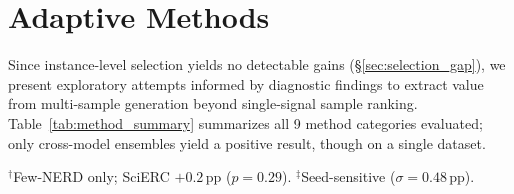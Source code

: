\section{Adaptive Methods}\label{sec:adaptive}

Since instance-level selection yields no detectable gains (\S\ref{sec:selection_gap}), we present exploratory attempts informed by diagnostic findings to extract value from multi-sample generation beyond single-signal sample ranking.
Table~\ref{tab:method_summary} summarizes all 9 method categories evaluated; only cross-model ensembles yield a positive result, though on a single dataset.

\begin{table}[t]
\centering
\small
\caption{Summary of 9 method categories tested (including MV baseline, LP selection, and cross-model ensemble beyond self-verification methods in Appendix~\ref{sec:mechanistic} and adaptive methods in this section). $\Delta$F1 vs.\ greedy; dataset in parentheses. Full coverage in Appendix~\ref{app:method_coverage}.}
\label{tab:method_summary}
{\footnotesize $^\dagger$Few-NERD only; SciERC $+0.2$\,pp ($p{=}0.29$). $^\ddagger$Seed-sensitive ($\sigma{=}0.48$\,pp).}
\end{table}

